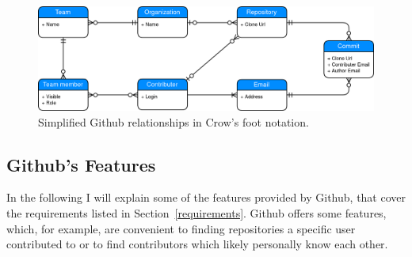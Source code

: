 \begin{figure}[H]
\includegraphics[scale=0.27]{./graphs/github-data-structure}
\centering
\caption{Simplified Github relationships in Crow's foot notation.}\label{fig:github-relationship}
\end{figure}

\subsection{Github's Features}\label{github-features}
In the following I will explain some of the features provided by Github, that cover the requirements listed in Section~\ref{requirements}.
Github offers some features, which, for example, are convenient to finding repositories a specific user contributed to or to find contributors which likely personally know each other.

